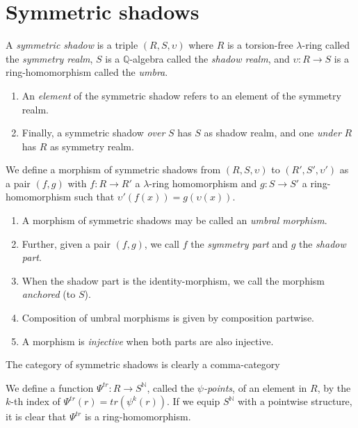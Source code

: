 
\section{Symmetric shadows}

\begin{definition}
  A \emph{symmetric shadow} is a triple $(R, S, \upsilon)$ where $R$ is a torsion-free $\lambda$-ring called the \emph{symmetry realm}, $S$ is a $\mathbb{Q}$-algebra called the \emph{shadow realm}, and $\upsilon: R \to S$ is a ring-homomorphism called the \emph{umbra}. 
  \begin{enumerate}
    \item An \emph{element} of the symmetric shadow refers to an element of the symmetry realm. 
    \item Finally, a symmetric shadow \emph{over} $S$ has $S$ as shadow realm, and one \emph{under} $R$ has $R$ as symmetry realm.
  \end{enumerate}
\end{definition}

\begin{definition}
  We define a morphism of symmetric shadows from $(R, S, \upsilon)$ to $(R', S', \upsilon')$ as a pair $(f, g)$ with $f : R \to R'$ a $\lambda$-ring homomorphism and $g : S \to S'$ a ring-homomorphism such that $\upsilon'(f(x)) = g(\upsilon(x))$. 
  \begin{enumerate}
    \item A morphism of symmetric shadows may be called an \emph{umbral morphism}. 
    \item Further, given a pair $(f, g)$, we call $f$ the \emph{symmetry part} and $g$ the \emph{shadow part}. 
    \item When the shadow part is the identity-morphism, we call the morphism \emph{anchored} (to $S$). 
    \item Composition of umbral morphisms is given by composition partwise. 
    \item A morphism is \emph{injective} when both parts are also injective. 
  \end{enumerate}
\end{definition}

\begin{remark}
  The category of symmetric shadows is clearly a comma-category
\end{remark}

\begin{definition}
  We define a function $\Psi^{tr} : R \to S^{\mathbb{N}}$, called the \emph{$\psi$-points}, of an element in $R$, by the $k$-th index of $\Psi^{tr}(r) = tr(\psi^k(r))$. If we equip $S^{\mathbb{N}}$ with a pointwise structure, it is clear that $\Psi^{tr}$ is a ring-homomorphism. 
\end{definition}


